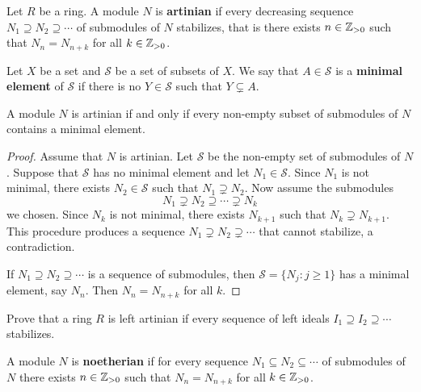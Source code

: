 \lecture{}


\begin{definition}
	Let $R$ be a ring. A module $N$ is \textbf{artinian} if every decreasing sequence 
	$N_1\supseteq N_2\supseteq\cdots$ of submodules of $N$ stabilizes, that is
	there exists $n\in\mathbb{Z}_{>0}$ such that 
	$N_n=N_{n+k}$ for all $k\in\mathbb{Z}_{>0}$.
\end{definition}

Let $X$ be a set and $\mathcal{S}$ be a set of subsets of $X$. 
We say that $A\in\mathcal{S}$ is a \textbf{minimal element} of $\mathcal{S}$
if there is no $Y\in\mathcal{S}$ such that $Y\subsetneq A$. 

\begin{proposition}
\label{pro:artinian_minimal}
	A module $N$ is artinian if and only if every non-empty subset of submodules of $N$ 
	contains a minimal element. 
\end{proposition}

\begin{proof}
	Assume that $N$ is artinian. Let $\mathcal{S}$ be the non-empty set of submodules of $N$. 
	Suppose that $\mathcal{S}$ has no minimal element and let $N_1\in\mathcal{S}$. 
	Since $N_1$ is not minimal, there exists 
	$N_2\in\mathcal{S}$ such that $N_1\supsetneq N_2$. Now assume the 
	submodules 
	\[
	N_1\supsetneq N_2\supseteq\cdots\supsetneq N_k
	\]
	we chosen. 
	Since $N_k$ is not minimal, there exists $N_{k+1}$ such that $N_k\supsetneq N_{k+1}$.
	This procedure produces a sequence $N_1\supsetneq
	N_2\supsetneq\cdots$ that cannot stabilize, a contradiction. 
	
	If $N_1\supseteq N_2\supseteq\cdots$ is a sequence of submodules, then 
	$\mathcal{S}=\{N_j:j\geq1\}$ has a minimal element, say $N_n$. Then
	$N_n=N_{n+k}$ for all $k$. 
\end{proof}

\begin{exercise}
    Prove that a ring $R$ is left artinian if every sequence of 
    left ideals $I_1\supseteq I_2\supseteq\cdots$ stabilizes. 
\end{exercise}

A module $N$ is \textbf{noetherian} if for every sequence 
$N_1\subseteq N_2\subseteq\cdots$ of submodules of $N$ there exists $n\in\mathbb{Z}_{>0}$ such that 
$N_n=N_{n+k}$ for all $k\in\mathbb{Z}_{>0}$. 


